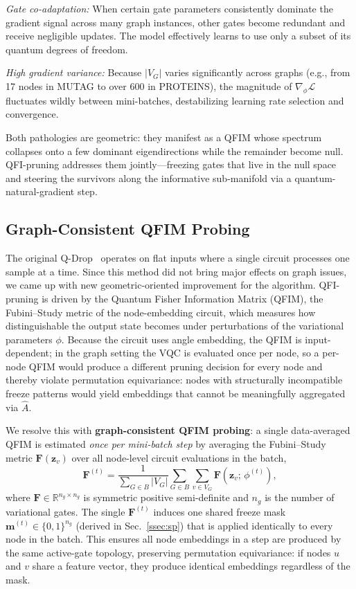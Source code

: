 \documentclass[journal]{IEEEtran}
\begin{document}
\textit{Gate co-adaptation:} When certain gate parameters consistently
dominate the gradient signal across many graph instances, other gates
become redundant and receive negligible updates. The model effectively
learns to use only a subset of its quantum degrees of freedom.

\textit{High gradient variance:} Because $|V_G|$ varies significantly
across graphs (e.g., from 17 nodes in MUTAG to over 600 in PROTEINS),
the magnitude of $\nabla_\phi \mathcal{L}$ fluctuates wildly between
mini-batches, destabilizing learning rate selection and convergence.

Both pathologies are geometric: they manifest as a QFIM whose spectrum
collapses onto a few dominant eigendirections while the remainder become
null. QFI-pruning addresses them jointly---freezing gates that live in the
null space and steering the survivors along the informative sub-manifold
via a quantum-natural-gradient step.

\subsection{Graph-Consistent QFIM Probing}
\label{ssec:qdrop}
The original Q-Drop~\cite{QDrop2025ICC} operates on flat inputs where a
single circuit processes one sample at a time. Since this method did not bring major effects on graph issues, we came up with new geometric-oriented improvement for the algorithm.
QFI-pruning is driven by the Quantum Fisher Information Matrix (QFIM),
the Fubini--Study metric of the node-embedding circuit, which measures
how distinguishable the output state becomes under perturbations of the
variational parameters $\phi$. Because the circuit uses angle embedding,
the QFIM is input-dependent; in the graph setting the VQC is evaluated
once per node, so a per-node QFIM would produce a different pruning
decision for every node and thereby violate permutation equivariance:
nodes with structurally incompatible freeze patterns would yield
embeddings that cannot be meaningfully aggregated via $\hat{A}$.

We resolve this with \textbf{graph-consistent QFIM probing}: a single
data-averaged QFIM is estimated \emph{once per mini-batch step} by
averaging the Fubini--Study metric $\mathbf{F}(\mathbf{z}_v)$ over all
node-level circuit evaluations in the batch,
\begin{equation}
  \mathbf{F}^{(t)} = \frac{1}{\sum_{G \in B}|V_G|}
  \sum_{G \in B}\sum_{v \in V_G} \mathbf{F}\!\left(\mathbf{z}_v;\,\phi^{(t)}\right),
  \label{eq:qdrop_graph}
\end{equation}
where $\mathbf{F} \in \mathbb{R}^{n_g \times n_g}$ is symmetric positive
semi-definite and $n_g$ is the number of variational gates. The single
$\mathbf{F}^{(t)}$ induces one shared freeze mask
$\mathbf{m}^{(t)} \in \{0,1\}^{n_g}$ (derived in
Sec.~\ref{ssec:sp}) that is applied identically to every node in the
batch. This ensures all node embeddings in a step are produced by the
same active-gate topology, preserving permutation equivariance: if nodes
$u$ and $v$ share a feature vector, they produce identical embeddings
regardless of the mask.
\end{document}
